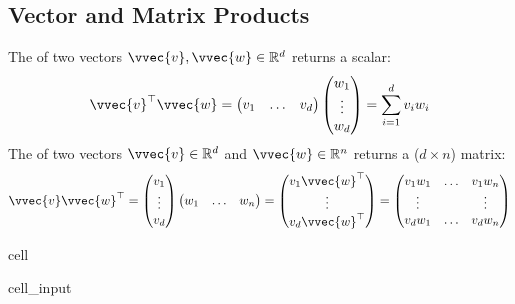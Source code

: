 \documentclass[letterpaper,10pt,english]{jupyterBook}
\begin{document}
\subsection{Vector and Matrix Products}
\label{\detokenize{linalg_spaces:vector-and-matrix-products}}
\sphinxAtStartPar
The  of two vectors \(\vvec{v},\vvec{w}\in\mathbb{R}^d\) returns a scalar:
\begin{align*}
\vvec{v}^\top\vvec{w} = \begin{pmatrix}v_1&\ldots & v_d\end{pmatrix}\begin{pmatrix}w_1\\\vdots\\w_d\end{pmatrix}=\sum_{i=1}^dv_iw_i 
\end{align*}
\sphinxAtStartPar
The  of two vectors \(\vvec{v}\in\mathbb{R}^d\) and \(\vvec{w}\in\mathbb{R}^n\) returns a (\(d\times n\)) matrix:
\begin{align*}
    \vvec{v}\vvec{w}^\top = \begin{pmatrix}v_1\\ \vdots \\ v_d\end{pmatrix}\begin{pmatrix}w_1 & \ldots &w_n\end{pmatrix} = 
    \begin{pmatrix} v_1\vvec{w}^\top\\
    \vdots\\
    v_d \vvec{w}^\top
    \end{pmatrix}
    = \begin{pmatrix}
     v_1w_1 &\ldots & v_1w_n\\
     \vdots &       & \vdots\\
     v_dw_1    &\ldots & v_dw_n     
    \end{pmatrix}
\end{align*}
\begin{sphinxuseclass}{cell}\begin{sphinxVerbatimInput}

\begin{sphinxuseclass}{cell_input}
\begin{sphinxVerbatim}[commandchars=\\\{\}]
  \PYG{p}{[}\PYG{p}{]}
  \PYG{p}{[}\PYG{p}{]}
\end{sphinxVerbatim}

\end{sphinxuseclass}\end{sphinxVerbatimInput}

\end{sphinxuseclass}
\end{document}
